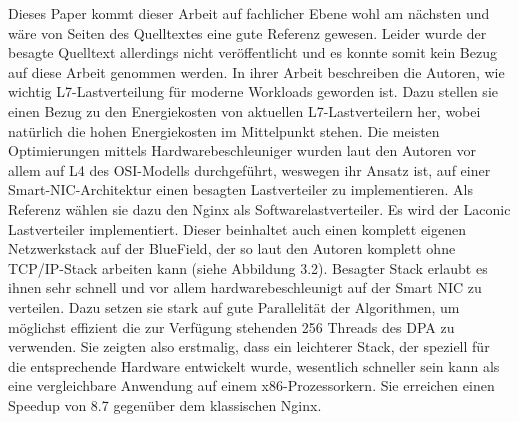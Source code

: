 Dieses Paper kommt dieser Arbeit auf fachlicher Ebene wohl am nächsten und wäre von Seiten des Quelltextes eine gute Referenz gewesen. Leider wurde der besagte Quelltext allerdings nicht veröffentlicht und es konnte somit kein Bezug auf diese Arbeit genommen werden.
In ihrer Arbeit beschreiben die Autoren, wie wichtig L7-Lastverteilung für moderne Workloads geworden ist. Dazu stellen sie einen Bezug zu den Energiekosten von aktuellen L7-Lastverteilern her, wobei natürlich die hohen Energiekosten im Mittelpunkt stehen. Die meisten Optimierungen mittels Hardwarebeschleuniger wurden laut den Autoren vor allem auf L4 des OSI-Modells durchgeführt, weswegen ihr Ansatz ist, auf einer Smart-NIC-Architektur einen besagten Lastverteiler zu implementieren. Als Referenz wählen sie dazu den Nginx als Softwarelastverteiler. Es wird der Laconic Lastverteiler implementiert. Dieser beinhaltet auch einen komplett eigenen Netzwerkstack auf der BlueField, der so laut den Autoren komplett ohne TCP/IP-Stack arbeiten kann (siehe Abbildung 3.2). Besagter Stack erlaubt es ihnen sehr schnell und vor allem hardwarebeschleunigt auf der Smart NIC zu verteilen. Dazu setzen sie stark auf gute Parallelität der Algorithmen, um möglichst effizient die zur Verfügung stehenden 256 Threads des DPA zu verwenden. Sie zeigten also erstmalig, dass ein leichterer Stack, der speziell für die entsprechende Hardware entwickelt wurde, wesentlich schneller sein kann als eine vergleichbare Anwendung auf einem x86-Prozessorkern. Sie erreichen einen Speedup von 8.7 gegenüber dem klassischen Nginx.